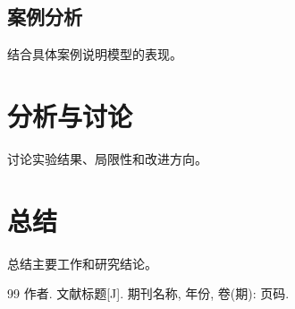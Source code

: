 \documentclass{sdxxpaper}
\begin{document}
\subsection{案例分析}
结合具体案例说明模型的表现。

\section{分析与讨论}
讨论实验结果、局限性和改进方向。

\section{总结}
总结主要工作和研究结论。

\begin{thebibliography}{99}
 作者. 文献标题[J]. 期刊名称, 年份, 卷(期): 页码.
\end{thebibliography}
\end{document}
